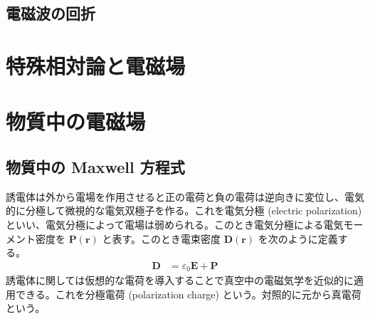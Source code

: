 \documentclass[uplatex,dvipdfmx,a4paper,11pt]{jlreq}
\newcommand{\EE}{\bm{E}}
\newcommand{\DD}{\bm{D}}
\newcommand{\PP}{\bm{P}}
\newcommand{\rr}{\bm{r}}
\numberwithin{equation}{section}
\theoremstyle{definition}
\begin{document}
\begin{theorem}[平行導体板]
\end{theorem}

\begin{theorem}[導波管内を伝搬する電磁波]
\end{theorem}

\begin{theorem}[円形断面の導波管内を伝搬する電磁波]
\end{theorem}

\begin{theorem}[直方形型の導波管内を伝搬する電磁波]
\end{theorem}

\subsection{電磁波の回折}

\begin{theorem}
\end{theorem}

\begin{theorem}
\end{theorem}

\begin{theorem}[Fraunhofer 回折]
\end{theorem}

\begin{theorem}[Fresnel 回折]
\end{theorem}

\section{特殊相対論と電磁場}

\section{物質中の電磁場}
\subsection{物質中の Maxwell 方程式}
\begin{definition}[誘電体]
  誘電体は外から電場を作用させると正の電荷と負の電荷は逆向きに変位し、電気的に分極して微視的な電気双極子を作る。これを電気分極 (electric polarization) といい、電気分極によって電場は弱められる。このとき電気分極による電気モーメント密度を $\PP(\rr)$ と表す。このとき電束密度 $\DD(\rr)$ を次のように定義する。
  \begin{align}
    \DD & = \varepsilon_0\EE + \PP
  \end{align}
  誘電体に関しては仮想的な電荷を導入することで真空中の電磁気学を近似的に適用できる。これを分極電荷 (polarization charge) という。対照的に元から真電荷という。
\end{definition}
\end{document}
